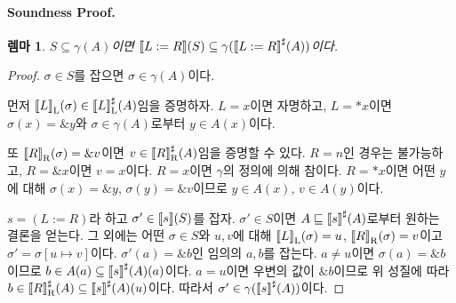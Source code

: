 \documentclass[a4paper, 10pt]{article}
\newtheorem{lemma}{렘마}
\begin{document}
\paragraph{Soundness Proof.}
\begin{lemma}
$S\subseteq\gamma(A)$이면 ${\llbracket L:=R \rrbracket}(S)\subseteq\gamma({\llbracket L:=R \rrbracket}^{\sharp}(A))$이다.
\end{lemma}
\begin{proof}
$\sigma\in S$를 잡으면 $\sigma\in\gamma(A)$이다.

먼저 ${\llbracket L \rrbracket}_{\mathrm L}(\sigma)\in{\llbracket L \rrbracket}^{\sharp}_{\mathrm L}(A)$임을 증명하자.
$L=x$이면 자명하고, $L=*x$이면 $\sigma(x)=\&y$와 $\sigma\in\gamma(A)$로부터 $y\in A(x)$이다.

또 ${\llbracket R \rrbracket}_{\mathrm R}(\sigma)=\&v$이면 $v\in{\llbracket R \rrbracket}^{\sharp}_{\mathrm R}(A)$임을 증명할 수 있다.
$R=n$인 경우는 불가능하고, $R=\&x$이면 $v=x$이다.
$R=x$이면 $\gamma$의 정의에 의해 참이다.
$R=*x$이면 어떤 $y$에 대해 $\sigma(x)=\&y$, $\sigma(y)=\&v$이므로
$y\in A(x)$, $v\in A(y)$이다.

$s=(L:=R)$라 하고 $\sigma'\in{\llbracket s \rrbracket}(S)$를 잡자.
$\sigma'\in S$이면 $A\sqsubseteq {\llbracket s \rrbracket}^{\sharp}(A)$로부터 원하는 결론을 얻는다.
그 외에는 어떤 $\sigma\in S$와 $u,v$에 대해
${\llbracket L \rrbracket}_{\mathrm L}(\sigma)=u$, ${\llbracket R \rrbracket}_{\mathrm R}(\sigma)=v$이고
$\sigma'=\sigma[u\mapsto v]$이다.
$\sigma'(a)=\&b$인 임의의 $a,b$를 잡는다.
$a\ne u$이면 $\sigma(a)=\&b$이므로 $b\in A(a)\subseteq {\llbracket s \rrbracket}^{\sharp}(A)(a)$이다.
$a=u$이면 우변의 값이 $\&b$이므로 위 성질에 따라
$b\in{\llbracket R \rrbracket}^{\sharp}_{\mathrm R}(A)\subseteq {\llbracket s \rrbracket}^{\sharp}(A)(u)$이다.
따라서 $\sigma'\in\gamma({\llbracket s \rrbracket}^{\sharp}(A))$이다.
\end{proof}
\end{document}
